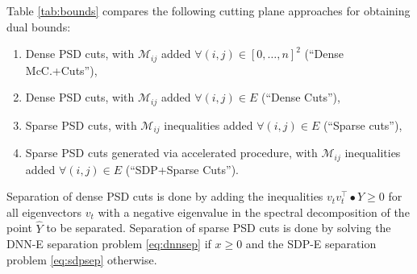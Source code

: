 \documentclass[twoside]{article}
\newcommand{\oo}[1]{{\textcolor{blue}{#1}}}
\newcommand{\ooc}[1]{{ \oo{[OG comment: #1}]}}
\newcommand{\jim}[1]{{ \oo{[Jim comment: #1}]}}
\begin{document}
		
		
		Table \ref{tab:bounds} compares the following cutting plane approaches for obtaining dual bounds: 
		\begin{enumerate}
			\setlength{\itemsep}{-0.3ex}
			\item Dense PSD cuts, with $\mathcal{M}_{ij}$ added $\forall (i,j) \in [0,\ldots,n]^2$ (``Dense McC.+Cuts''), 
			\item Dense PSD cuts, with $\mathcal{M}_{ij}$ added $\forall (i,j) \in E$ (``Dense Cuts''), 
			\item Sparse PSD cuts, with $\mathcal{M}_{ij}$ inequalities added $\forall (i,j) \in E$ (``Sparse cuts''),
			\item Sparse PSD cuts generated via accelerated procedure, with $\mathcal{M}_{ij}$ inequalities added $\forall (i,j) \in E$ (``SDP+Sparse Cuts'').
		\end{enumerate}
		Separation of dense PSD cuts is done by adding the inequalities $v_t v_t^\top \bullet Y \geq 0$ for all eigenvectors $v_t$ with a negative eigenvalue in the spectral decomposition of the point $\widehat{Y}$ to be separated.
		Separation of sparse PSD cuts is done by solving the DNN-E separation problem \eqref{eq:dnnsep} if $x \geq 0$ and the SDP-E separation problem \eqref{eq:sdpsep} otherwise.
		
\end{document}

